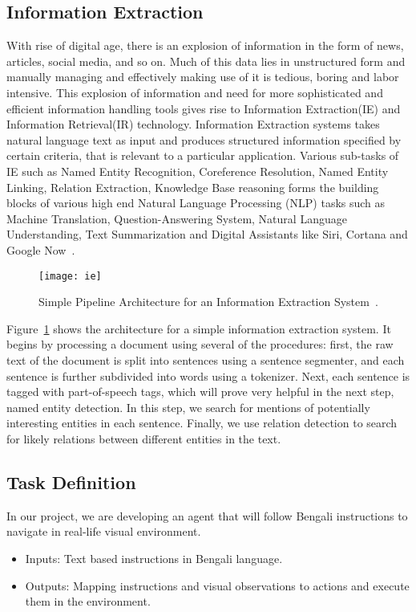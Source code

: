 \subsection{Information Extraction}
With rise of digital age, there is an explosion of information in the form of news, articles, social media, and so on. Much of this data lies in unstructured form and manually managing and effectively making use of it is tedious, boring and labor intensive. This explosion of information and need for more sophisticated and efficient information handling tools gives rise to Information Extraction(IE) and Information Retrieval(IR) technology. Information Extraction systems takes natural language text as input and produces structured information specified by certain criteria, that is relevant to a particular application. Various sub-tasks of IE such as Named Entity Recognition, Coreference Resolution, Named Entity Linking, Relation Extraction, Knowledge Base reasoning forms the building blocks of various high end Natural Language Processing (NLP) tasks such as Machine Translation, Question-Answering System, Natural Language Understanding, Text Summarization and Digital Assistants like Siri, Cortana and Google Now~\cite{DBLP:journals/corr/abs-1807-02383}.
\begin{figure}[htbp]
    \centering
    \texttt{[image: ie]}
    \caption{Simple Pipeline Architecture for an Information Extraction System~\cite{DBLP:journals/corr/abs-1807-02383}.}
    \label{fig:2}
\end{figure}

Figure~\ref{fig:2} shows the architecture for a simple information extraction system. It begins by processing a document using several of the procedures: first, the raw text of the document is split into sentences using a sentence segmenter, and each sentence is further subdivided into words using a tokenizer. Next, each sentence is tagged with part-of-speech tags, which will prove very helpful in the next step, named entity detection. In this step, we search for mentions of potentially interesting entities in each sentence. Finally, we use relation detection to search for likely relations between different entities in the text.
\subsection{Task Definition}
In our project, we are developing an agent that will follow Bengali instructions to navigate in real-life visual environment.
\begin{itemize}
	\item Inputs: Text based instructions in Bengali language.
	\item Outputs: Mapping instructions and visual observations to actions and execute them in the environment.
\end{itemize}

